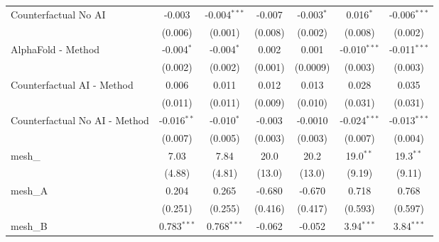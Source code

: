 \begin{tabular}{lcccccc}
   Counterfactual No AI                                        & -0.003         & -0.004$^{***}$ & -0.007         & -0.003$^{*}$   & 0.016$^{*}$    & -0.006$^{***}$\\   
                                                               & (0.006)        & (0.001)        & (0.008)        & (0.002)        & (0.008)        & (0.002)\\   
   AlphaFold - Method                                          & -0.004$^{*}$   & -0.004$^{*}$   & 0.002          & 0.001          & -0.010$^{***}$ & -0.011$^{***}$\\   
                                                               & (0.002)        & (0.002)        & (0.001)        & (0.0009)       & (0.003)        & (0.003)\\   
   Counterfactual AI - Method                                  & 0.006          & 0.011          & 0.012          & 0.013          & 0.028          & 0.035\\   
                                                               & (0.011)        & (0.011)        & (0.009)        & (0.010)        & (0.031)        & (0.031)\\   
   Counterfactual No AI - Method                               & -0.016$^{**}$  & -0.010$^{*}$   & -0.003         & -0.0010        & -0.024$^{***}$ & -0.013$^{***}$\\   
                                                               & (0.007)        & (0.005)        & (0.003)        & (0.003)        & (0.007)        & (0.004)\\   
   mesh\_                                                      & 7.03           & 7.84           & 20.0           & 20.2           & 19.0$^{**}$    & 19.3$^{**}$\\   
                                                               & (4.88)         & (4.81)         & (13.0)         & (13.0)         & (9.19)         & (9.11)\\   
   mesh\_A                                                     & 0.204          & 0.265          & -0.680         & -0.670         & 0.718          & 0.768\\   
                                                               & (0.251)        & (0.255)        & (0.416)        & (0.417)        & (0.593)        & (0.597)\\   
   mesh\_B                                                     & 0.783$^{***}$  & 0.768$^{***}$  & -0.062         & -0.052         & 3.94$^{***}$   & 3.84$^{***}$\\   

\end{tabular}
